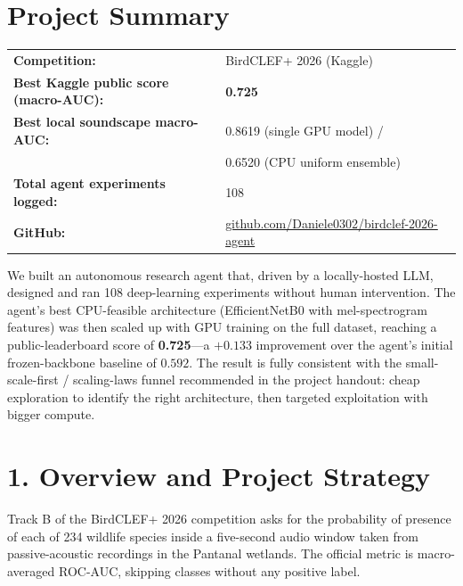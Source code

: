 \documentclass[11pt,a4paper]{article}
\begin{document}
\section*{Project Summary}

\begin{center}
\begin{tabular}{@{}l p{9.5cm}@{}}
\textbf{Competition:} & BirdCLEF+ 2026 (Kaggle) \\
\textbf{Best Kaggle public score (macro-AUC):} & \textbf{0.725} \\
\textbf{Best local soundscape macro-AUC:} & 0.8619 (single GPU model) /\\
                                          & 0.6520 (CPU uniform ensemble) \\
\textbf{Total agent experiments logged:} & 108 \\
\textbf{GitHub:} & \href{https://github.com/Daniele0302/birdclef-2026-agent}{github.com/Daniele0302/birdclef-2026-agent} \\
\end{tabular}
\end{center}

\vspace{0.4cm}

\noindent We built an autonomous research agent that, driven by a locally-hosted LLM, designed and ran 108 deep-learning experiments without human intervention. The agent's best CPU-feasible architecture (EfficientNetB0 with mel-spectrogram features) was then scaled up with GPU training on the full dataset, reaching a public-leaderboard score of \textbf{0.725}---a $+0.133$ improvement over the agent's initial frozen-backbone baseline of $0.592$. The result is fully consistent with the small-scale-first / scaling-laws funnel recommended in the project handout: cheap exploration to identify the right architecture, then targeted exploitation with bigger compute.

\vspace{0.4cm}

\section*{1. Overview and Project Strategy}

Track B of the BirdCLEF+ 2026 competition asks for the probability of presence of each of 234 wildlife species inside a five-second audio window taken from passive-acoustic recordings in the Pantanal wetlands. The official metric is macro-averaged ROC-AUC, skipping classes without any positive label.
\end{document}
